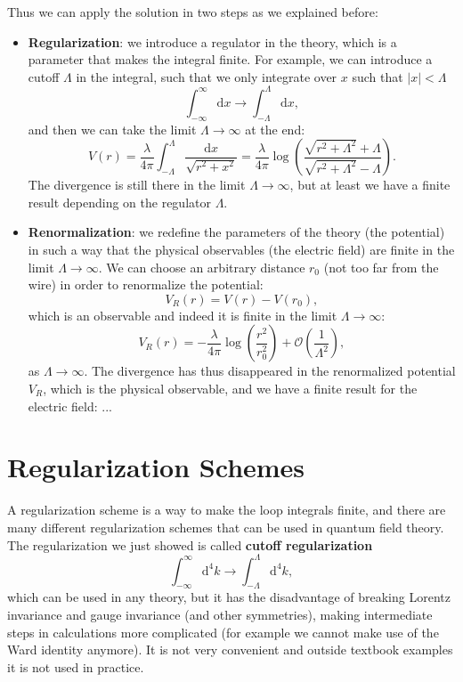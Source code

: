 Thus we can apply the solution in two steps as we explained before:
\begin{itemize}
    \item \textbf{Regularization}: we introduce a regulator in the theory, which is a parameter that makes the integral finite. For example, we can introduce a cutoff \(\Lambda\) in the integral, such that we only integrate over \(x\) such that \(\vert x \vert < \Lambda\)
          \[
              \int_{-\infty}^{\infty} \mathrm{d} x \to \int_{-\Lambda}^{\Lambda} \mathrm{d} x,
          \]
          and then we can take the limit \(\Lambda \to \infty\) at the end:
          \[
              V(r) = \frac{\lambda}{4 \pi} \int_{-\Lambda}^{\Lambda} \frac{\mathrm{d} x}{\sqrt{r^2 + x^2}} = \frac{\lambda}{4 \pi} \log\left( \frac{\sqrt{r^2 + \Lambda^2} + \Lambda}{\sqrt{r^2 + \Lambda^2} - \Lambda}\right).
          \]
          The divergence is still there in the limit \(\Lambda \to \infty\), but at least we have a finite result depending on the regulator \(\Lambda\).

    \item \textbf{Renormalization}: we redefine the parameters of the theory (the potential) in such a way that the physical observables (the electric field) are finite in the limit \(\Lambda \to \infty\). We can choose an arbitrary distance \(r_0\) (not too far from the wire) in order to renormalize the potential:
          \[
              V_R(r) = V(r) - V(r_0),
          \]
          which is an observable and indeed it is finite in the limit \(\Lambda \to \infty\):
          \[
              V_R(r) = - \frac{\lambda}{4 \pi} \log\left( \frac{r^2}{r_0^2} \right) + \mathcal{O}(\frac{1}{\Lambda^2}),
          \]
          as \(\Lambda \to \infty\). The divergence has thus disappeared in the renormalized potential \(V_R\), which is the physical observable, and we have a finite result for the electric field: ...
\end{itemize}

\section{Regularization Schemes}

A regularization scheme is a way to make the loop integrals finite, and there are many different regularization schemes that can be used in quantum field theory. The regularization we just showed is called \textbf{cutoff regularization}
\[
    \int_{-\infty}^{\infty} \mathrm{d}^4 k \to \int_{-\Lambda}^{\Lambda} \mathrm{d}^4 k,
\]
which can be used in any theory, but it has the disadvantage of breaking Lorentz invariance and gauge invariance (and other symmetries), making intermediate steps in calculations more complicated (for example we cannot make use of the Ward identity anymore). It is not very convenient and outside textbook examples it is not used in practice.

